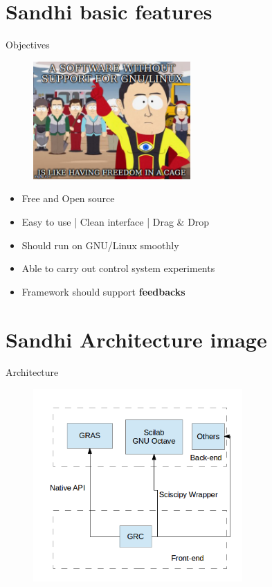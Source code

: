 \documentclass{beamer}
\begin{document}
\section{Sandhi basic features}
\begin{frame}{Objectives}
\begin{figure} [ht!]
	\centering
	\includegraphics[width=60mm]{meme2.jpg}
\end{figure}

\begin{itemize}
  \item Free and Open source
  \item Easy to use | Clean interface | Drag \& Drop 
  \item Should run on GNU/Linux smoothly
  \item Able to carry out control system experiments
  \item Framework should support \textbf{feedbacks}
\end{itemize}
\vskip 1cm
\end{frame}

\section{Sandhi Architecture image}
\begin{frame}{Architecture}

\begin{figure} [ht!]
	\centering
	\includegraphics[width=80mm]{image.png}
\end{figure}
\vskip 1cm
\end{frame}
\end{document}
